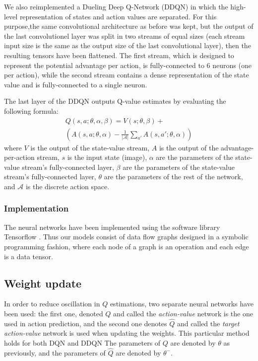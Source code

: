 \documentclass[letterpaper]{article}
\begin{document}
We also reimplemented a Dueling Deep Q-Network (DDQN) in which the high-level representation of states and action values are separated.
For this purpose,the same convolutional architecture as before was kept, but the output of the last convolutionel layer was split in two streams of
equal sizes (each stream input size is the same as the output size of the last convolutional layer), then the resulting tensors have been flattened.
The first stream, which is designed to represent the potential advantage per action, is fully-connected to 6 neurons (one per action), while the second stream
contains a dense representation of the state value and is fully-connected to a single neuron.

The last layer of the DDQN outputs Q-value estimates by evaluating the following formula:
\begin{multline}
    Q(s, a; \theta, \alpha, \beta) = V(s; \theta, \beta) + \\ \left(A(s, a; \theta, \alpha) - \frac{1}{|\mathcal{A}|} \sum_{a'} A(s, a'; \theta, \alpha)\right)
\end{multline}
where $V$ is the output of the state-value stream, $A$ is the output of the advantage-per-action stream, $s$ is the input state (image),
$\alpha$ are the parameters of the state-value stream's fully-connected layer, $\beta$ are the parameters of the state-value stream's
fully-connected layer, $\theta$ are the parameters of the rest of the network, and $\mathcal{A}$ is the discrete action space.

\subsubsection{Implementation}
The neural networks have been implemented using the software library Tensorflow \citep{tensorflow2015-whitepaper}.
Thus our models consist of data flow graphs designed in a symbolic programming fashion, where each node of a graph is an operation
and each edge is a data tensor.

\subsection{Weight update}

In order to reduce oscillation in $Q$ estimations, two separate neural networks have been used: the first one, denoted $Q$ and called the \textit{action-value}
network is the one used in action prediction, and the second one denotes $\hat Q$ and called the \textit{target action-value} network is used when
updating the weights. This particular method holds for both DQN and DDQN The parameters of $Q$ are denoted by $\theta$ as previously, and the parameters of
$\hat Q$ are denoted by $\theta^-$.
\end{document}
